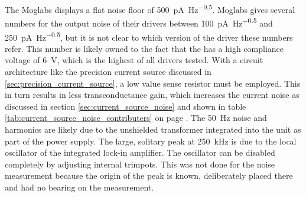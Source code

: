 The Moglabs  displays a flat noise floor of \qty{500}{\pA \per \Hz\tothe{0.5}}. Moglabs gives several numbers for the output noise of their drivers between \qty{100}{\pA \per \Hz\tothe{0.5}} and \qty{250}{\pA \per \Hz\tothe{0.5}}, but it is not clear to which version of the driver these numbers refer. This number is likely owned to the fact that the  has a high compliance voltage of \qty{6}{\V}, which is the highest of all drivers tested. With a circuit architecture like the precision current source discussed in \ref{sec:precision_current_source}, a low value sense resistor must be employed. This in turn results in less transconductance gain, which increases the current noise as discussed in section \ref{sec:current_source_noise} and shown in table \ref{tab:current_source_noise_contributers} on page \pageref{tab:current_source_noise_contributers}. The \qty{50}{\Hz} noise and harmonics are likely due to the unshielded transformer integrated into the unit as part of the power supply. The large, solitary peak at \qty{250}{\kHz} is due to the local oscillator of the integrated lock-in amplifier. The oscillator can be disabled completely by adjusting internal trimpots. This was not done for the noise measurement because the origin of the peak is known, deliberately placed there and had no bearing on the measurement.

